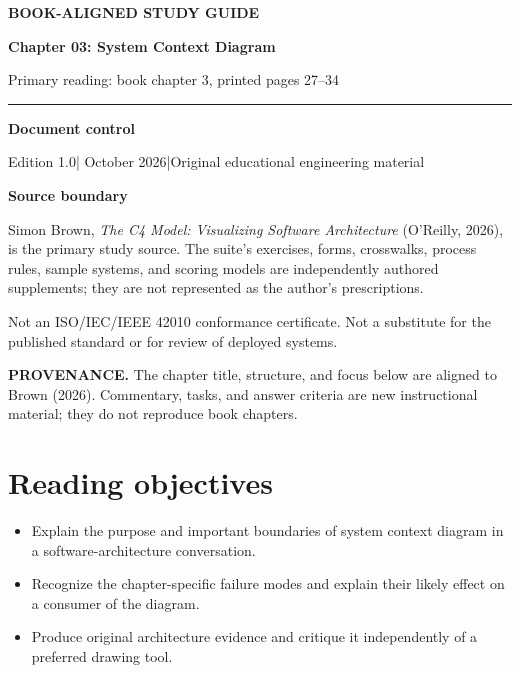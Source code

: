 \documentclass[10pt,letterpaper]{article}
\newcommand{\SourceNote}[1]{\par\smallskip\noindent\colorbox{C4Light}{\parbox{0.94\linewidth}{\footnotesize\textbf{PROVENANCE.} #1}}\par\medskip}
\newcommand{\DocStart}[3]{%
\begin{document}
\begin{titlepage}
\renewcommand{\thepage}{title-\arabic{page}}
\vspace*{0.55in}
{\sffamily\bfseries\small\color{C4Teal}#1}\par\vspace{0.24in}
{\sffamily\bfseries\fontsize{26}{31}\selectfont\color{C4Navy}#2}\par\vspace{0.18in}
{\large\color{C4Gray}#3}\par\vspace{0.4in}
\textcolor{C4Teal}{\rule{\linewidth}{1.15pt}}\par\vspace{0.24in}
\textbf{Document control}\par
Edition 1.0\quad|\quad 30 October 2026\quad|\quad Original educational engineering material\par
\vspace{0.17in}
\textbf{Source boundary}\par
Simon Brown, \emph{The C4 Model: Visualizing Software Architecture} (O'Reilly, 2026), is the primary study source. The suite's exercises, forms, crosswalks, process rules, sample systems, and scoring models are independently authored supplements; they are not represented as the author's prescriptions.\par
\vfill
{\small\color{C4Gray}Not an ISO/IEC/IEEE 42010 conformance certificate. Not a substitute for the published standard or for review of deployed systems.}\par
\end{titlepage}
}
\DocStart{BOOK-ALIGNED STUDY GUIDE}{Chapter 03: System Context Diagram}{Primary reading: book chapter 3, printed pages 27–34}
\SourceNote{The chapter title, structure, and focus below are aligned to Brown (2026). Commentary, tasks, and answer criteria are new instructional material; they do not reproduce book chapters.}
\section{Reading objectives}
\begin{itemize}
\item Explain the purpose and important boundaries of system context diagram in a software-architecture conversation.
\item Recognize the chapter-specific failure modes and explain their likely effect on a consumer of the diagram.
\item Produce original architecture evidence and critique it independently of a preferred drawing tool.
\end{itemize}
\end{document}
